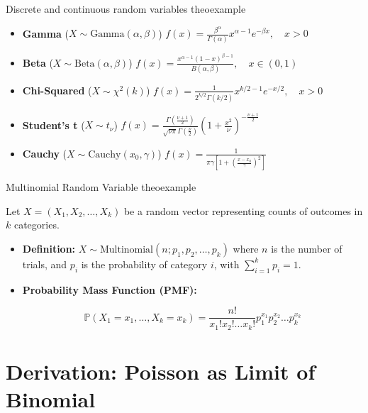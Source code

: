 \documentclass{tufte-handout}
\begin{document}
\begin{mybox}{Discrete and continuous random variables }{theoexample}
\begin{itemize}
    \item \textbf{Gamma} ($X \sim \text{Gamma}(\alpha, \beta)$)  
    $f(x) = \frac{\beta^\alpha}{\Gamma(\alpha)} x^{\alpha - 1} e^{-\beta x}, \quad x > 0$

    \item \textbf{Beta} ($X \sim \text{Beta}(\alpha, \beta)$)  
    $f(x) = \frac{x^{\alpha - 1} (1 - x)^{\beta - 1}}{B(\alpha, \beta)}, \quad x \in (0,1)$

    \item \textbf{Chi-Squared} ($X \sim \chi^2(k)$)  
    $f(x) = \frac{1}{2^{k/2} \Gamma(k/2)} x^{k/2 - 1} e^{-x/2}, \quad x > 0$

    \item \textbf{Student's t} ($X \sim t_\nu$)  
    $f(x) = \frac{\Gamma\left(\frac{\nu + 1}{2}\right)}{\sqrt{\nu \pi} \Gamma\left(\frac{\nu}{2}\right)} \left(1 + \frac{x^2}{\nu}\right)^{-\frac{\nu + 1}{2}}$

    \item \textbf{Cauchy} ($X \sim \text{Cauchy}(x_0, \gamma)$)  
    $f(x) = \frac{1}{\pi \gamma \left[1 + \left(\frac{x - x_0}{\gamma}\right)^2\right]}$
\end{itemize}

\end{mybox}

\begin{mybox}{Multinomial Random Variable }{theoexample}
\small

Let $X = (X_1, X_2, \dots, X_k)$ be a random vector representing counts of outcomes in $k$ categories.

\begin{itemize}
    \item \textbf{Definition:}  
    $X \sim \text{Multinomial}(n; p_1, p_2, \dots, p_k)$  
    where $n$ is the number of trials, and $p_i$ is the probability of category $i$, with $\sum_{i=1}^k p_i = 1$.

    \item \textbf{Probability Mass Function (PMF):}  
    

\[
    \mathbb{P}(X_1 = x_1, \dots, X_k = x_k) = \frac{n!}{x_1! x_2! \dots x_k!} p_1^{x_1} p_2^{x_2} \dots p_k^{x_k}
    \]

\end{itemize}
\end{mybox}

\section*{Derivation: Poisson as Limit of Binomial}
\end{document}
